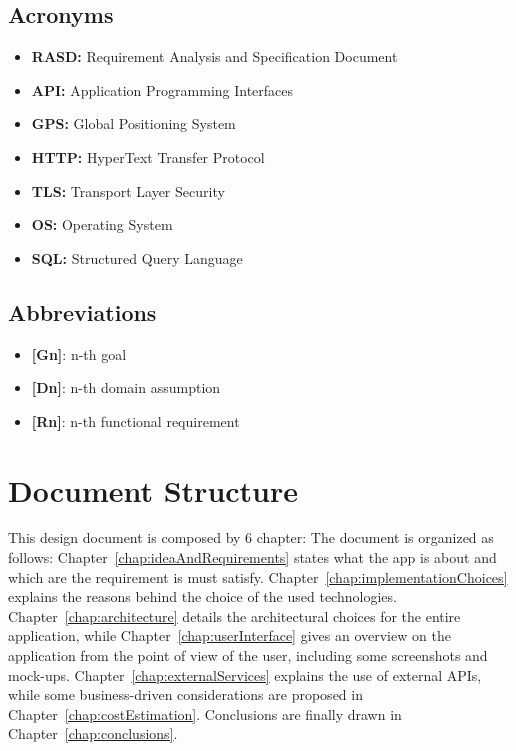 \subsection*{Acronyms}
\begin{itemize}
    \item \textbf{RASD:} Requirement Analysis and Specification Document
    \item \textbf{API:} Application Programming Interfaces
    \item \textbf{GPS:} Global Positioning System
    \item \textbf{HTTP:} HyperText Transfer Protocol
    \item \textbf{TLS:} Transport Layer Security
    \item \textbf{OS:} Operating System
    \item \textbf{SQL:} Structured Query Language
\end{itemize}
\subsection*{Abbreviations}
\begin{itemize}
    \item \textbf{{[Gn]}}: n-th goal
    \item \textbf{{[Dn]}}: n-th domain assumption
    \item \textbf{{[Rn]}}: n-th functional requirement
\end{itemize}

\section{Document Structure}
This design document is composed by 6 chapter:
The document is organized as follows: Chapter~\ref{chap:ideaAndRequirements} states what the app is about and which are the requirement is must satisfy. Chapter~\ref{chap:implementationChoices} explains the reasons behind the choice of the used technologies. Chapter~\ref{chap:architecture} details the architectural choices for the entire application, while Chapter~\ref{chap:userInterface} gives an overview on the application from the point of view of the user, including some screenshots and mock-ups. Chapter~\ref{chap:externalServices} explains the use of external APIs, while some business-driven considerations are proposed in Chapter~\ref{chap:costEstimation}. Conclusions are finally drawn in Chapter~\ref{chap:conclusions}.

